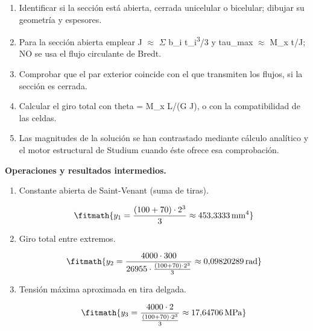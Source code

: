 \begin{enumerate}

\item Identificar si la sección está abierta, cerrada unicelular o bicelular; dibujar su geometría y espesores.

\item Para la sección abierta emplear J \ensuremath{\approx} \ensuremath{\Sigma} b\_i t\_i\textsuperscript{3}/3 y tau\_max \ensuremath{\approx} M\_x t/J; NO se usa el flujo circulante de Bredt.

\item Comprobar que el par exterior coincide con el que transmiten los flujos, si la sección es cerrada.

\item Calcular el giro total con theta = M\_x L/(G J), o con la compatibilidad de las celdas.

\item Las magnitudes de la solución se han contrastado mediante cálculo analítico y el motor estructural de Studium cuando éste ofrece esa comprobación.

\end{enumerate}

\noindent\textbf{Operaciones y resultados intermedios.}

\begin{enumerate}

\item Constante abierta de Saint-Venant (suma de tiras).

\[\fitmath{y_{1}=\frac{\left(100+70\right)\cdot {2}^{3}}{3}\approx 453{,}3333\,\mathrm{mm^{4}}}\]

\item Giro total entre extremos.

\[\fitmath{y_{2}=\frac{4000\cdot 300}{26955\cdot \frac{\left(100+70\right)\cdot {2}^{3}}{3}}\approx 0{,}09820289\,\mathrm{rad}}\]

\item Tensión máxima aproximada en tira delgada.

\[\fitmath{y_{3}=\frac{4000\cdot 2}{\frac{\left(100+70\right)\cdot {2}^{3}}{3}}\approx 17{,}64706\,\mathrm{MPa}}\]

\end{enumerate}
